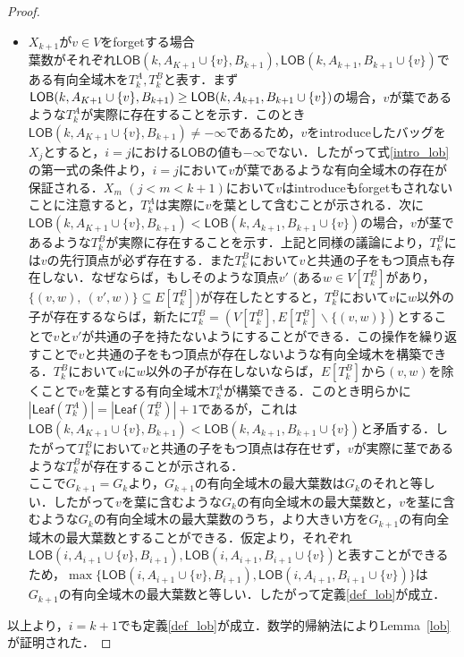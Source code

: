 \documentclass[master]{kuisthesis}		%
\theoremstyle{plain}
\theoremstyle{definition}
\begin{document}
{\begin{proof}
\begin{itemize}
        \item $X_{k+1}$が$v \in V$をforgetする場合 \\
        葉数がそれぞれ$\mathsf{LOB}(k, A_{K+1} \cup \{v\}, B_{k+1}), \mathsf{LOB}(k, A_{k+1}, B_{k+1} \cup \{v\})$である有向全域木を$T^A_k, T^B_k$と表す．まず$\mathsf{LOB}(k, A_{K+1} \cup \{v\}, B_{k+1}) \geq \\\mathsf{LOB}(k, A_{k+1}, B_{k+1} \cup \{v\})$の場合，$v$が葉であるような$T^A_k$が実際に存在することを示す．このとき$\mathsf{LOB}(k, A_{K+1} \cup \{v\}, B_{k+1}) \neq -\infty$であるため，$v$をintroduceしたバッグを$X_j$とすると，$i=j$における$\mathsf{LOB}$の値も$-\infty$でない．したがって式\ref{intro_lob}の第一式の条件より，$i=j$において$v$が葉であるような有向全域木の存在が保証される．$X_m$ $(j < m < k+1)$において$v$はintroduceもforgetもされないことに注意すると，$T^A_k$は実際に$v$を葉として含むことが示される．次に$\mathsf{LOB}(k, A_{K+1} \cup \{v\}, B_{k+1}) < \mathsf{LOB}(k, A_{k+1}, B_{k+1} \cup \{v\})$の場合，$v$が茎であるような$T^B_k$が実際に存在することを示す．上記と同様の議論により，$T^B_k$には$v$の先行頂点が必ず存在する．また$T^B_k$において$v$と共通の子をもつ頂点も存在しない．なぜならば，もしそのような頂点$v'$ (ある$w \in V[T^B_k]$があり，$\{(v, w),\ (v', w)\} \subseteq E[T^B_k]$)が存在したとすると，$T^B_k$において$v$に$w$以外の子が存在するならば，新たに$T^B_k = (V[T^B_k], E[T^B_k] \backslash \{(v, w)\})$とすることで$v$と$v'$が共通の子を持たないようにすることができる．この操作を繰り返すことで$v$と共通の子をもつ頂点が存在しないような有向全域木を構築できる．$T^B_k$において$v$に$w$以外の子が存在しないならば，$E[T^B_k]$から$(v, w)$を除くことで$v$を葉とする有向全域木$T^A_k$が構築できる．このとき明らかに$|\mathsf{Leaf}(T^A_k)| = |\mathsf{Leaf}(T^B_k)| + 1$であるが，これは$\mathsf{LOB}(k, A_{K+1} \cup \{v\}, B_{k+1}) < \mathsf{LOB}(k, A_{k+1}, B_{k+1} \cup \{v\})$と矛盾する．したがって$T^B_k$において$v$と共通の子をもつ頂点は存在せず，$v$が実際に茎であるような$T^B_k$が存在することが示される．\\
        ここで$G_{k+1} = G_k$より，$G_{k+1}$の有向全域木の最大葉数は$G_k$のそれと等しい．したがって$v$を葉に含むような$G_k$の有向全域木の最大葉数と，$v$を茎に含むような$G_k$の有向全域木の最大葉数のうち，より大きい方を$G_{k+1}$の有向全域木の最大葉数とすることができる．仮定より，それぞれ$\mathsf{LOB}(i, A_{i+1} \cup \{v\}, B_{i+1}), \mathsf{LOB}(i, A_{i+1}, B_{i+1} \cup \{v\})$と表すことができるため，$\max \{\mathsf{LOB}(i, A_{i+1} \cup \{v\}, B_{i+1}), \mathsf{LOB}(i, A_{i+1}, B_{i+1} \cup \{v\})\}$は$G_{k+1}$の有向全域木の最大葉数と等しい．したがって定義\ref{def_lob}が成立．
    \end{itemize}
    以上より，$i = k+1$でも定義\ref{def_lob}が成立．数学的帰納法によりLemma~\ref{lob}が証明された．
\end{proof}





}
\end{document}
